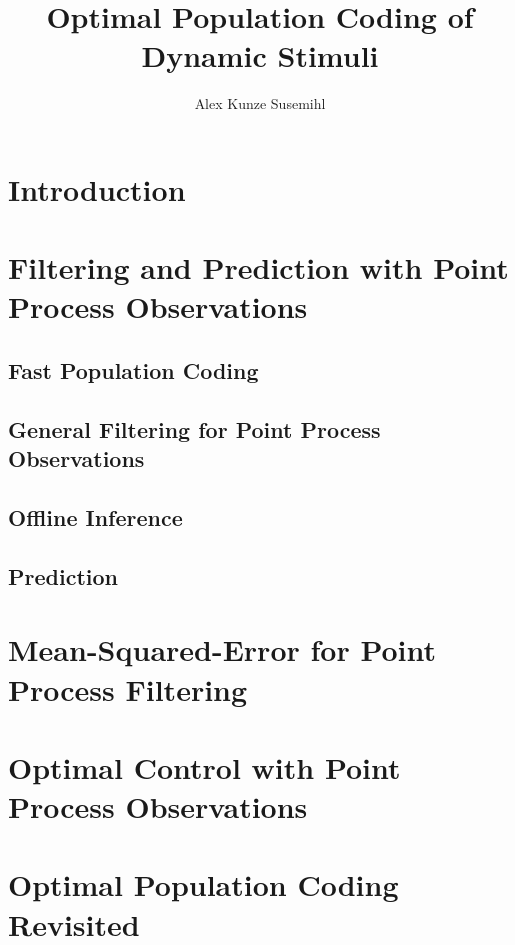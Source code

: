 \documentclass[justified,notitlepage]{tufte-book}
\title{Optimal Population Coding of Dynamic Stimuli}
\author{Alex Kunze Susemihl}
\begin{document}
\maketitle
\setcounter{secnumdepth}{1}
\tableofcontents
\chapter{Introduction}



\chapter{Filtering and Prediction with Point Process Observations}

\label{chap:filtering}



\section{Fast Population Coding}

\section{General Filtering for Point Process Observations}


\section{Offline Inference}

\section{Prediction}

\chapter{Mean-Squared-Error for Point Process Filtering}

\label{chap:MSE}

\chapter{Optimal Control with Point Process Observations}

\label{chap:control}



\chapter{Optimal Population Coding Revisited}
\end{document}
